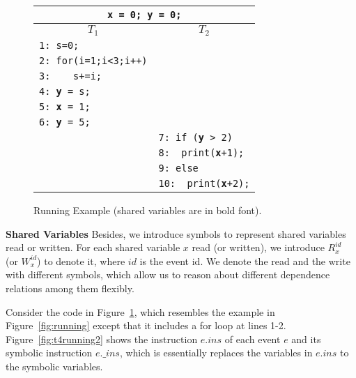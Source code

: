 \begin{figure}
\centering
\begin{tabular}{ll}
\multicolumn{2}{c}{{\tt {\bf x} = 0; {\bf y} = 0;}} \\
\hline
\multicolumn{1}{c}{$T_1$} & \multicolumn{1}{c}{$T_2$} \\
\hline
{\tt 1: s=0; } & \\
{\tt 2: for(i=1;i<3;i++)} & \\
{\tt 3: \ \ \ s+=i;} & \\
{\tt 4: {\bf y} = s;} & \\
{\tt 5: {\bf x} = 1;} & \\
{\tt 6: {\bf y} = 5;} & \\
& {\tt 7: if ({\bf y} > 2)} \\
& {\tt 8:~~print({\bf x}+1);} \\	
& {\color{Gray} {\tt 9: else}} \\
& {\color{Gray} {\tt 10:~~print({\bf x}+2);}}
\end{tabular}
\caption{Running Example (shared variables are in bold font). }
\label{fig:running2}
\end{figure}



{\bf Shared Variables}   Besides, we introduce symbols to represent shared variables read or written.  For each shared variable $x$ read (or written), we introduce $R^{id}_x$ (or $W^{id}_x$) to denote it, where $id$ is the event id. We denote the read and the write with different symbols, which allow us to reason about different dependence relations among them flexibly. 


Consider the code in Figure~\ref{fig:running2}, which resembles the example in Figure~\ref{fig:running} except that it includes a for loop at lines 1-2.
Figure~\ref{fig:t4running2} shows the instruction $e.ins$ of each event $e$ and its symbolic instruction $e.\_ins$, which is essentially replaces the variables in $e.ins$ to the symbolic variables. 
 


